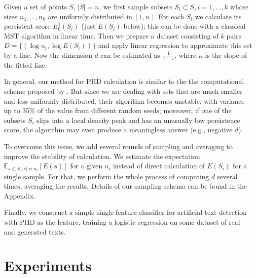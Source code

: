 \documentclass{article}
\begin{document}
Given a set of points $S$, $|S|=n$, we first sample subsets $S_i\subset S, i=1,\dots, k$ whose sizes $n_1, \dots, n_k$ are uniformly distributed in $[1, n]$. For each $S_i$ we calculate its persistent score $E_0^1(S_i)$ (just $E(S_i)$ below);
this can be done with a classical MST algorithm in linear time. Then we prepare a dataset consisting of $k$ pairs $D=\{(\log n_i, \log E(S_i))\}$ and apply linear regression to approximate this set by a line. 
Now the dimension $d$ can be estimated as $\frac{1}{1-\kappa}$, where $\kappa$ is the slope of the fitted line. 

In general, our method for PHD calculation is similar to the 
the computational scheme proposed by \citet{birdal2021intrinsic}. But since we are dealing with sets that are much smaller and less uniformly distributed, their algorithm becomes unstable, with variance up to 35\% of the value from different random seeds; moreover, if one of the subsets $S_i$ slips into a local density peak and has an unusually low persistence score, the algorithm may even produce a meaningless answer (e.g., negative $d$). 

To overcome this issue, we add several rounds of sampling and averaging to improve the stability of calculation. We estimate the expectation $\mathbb{E}_{s\subset S, |s|=n_i} [E(s)]$ for a given $n_i$ instead of direct calculation of $E(S_i)$ for a single sample. For that, we perform the whole process of computing $d$ several times, averaging the results. Details of our sampling schema can be found in the Appendix. 

Finally, we construct a simple single-feature classifier for artificial text detection with PHD as the feature, training a logistic regression on some dataset of real and generated texts.  










\section{Experiments}\label{sec:eval}
\end{document}
